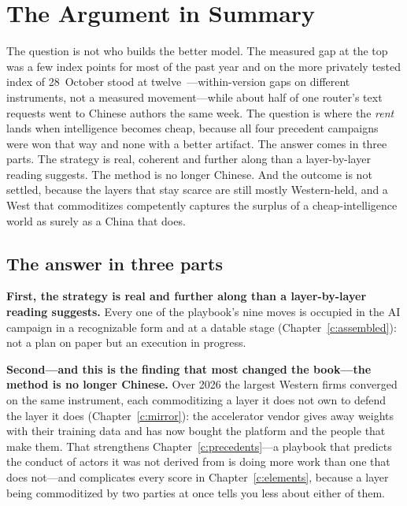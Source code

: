 \chapter{The Argument in Summary}
\label{c:summary}

\begin{glance}
The question is not who builds the better model. The measured gap at the top was a few index points for most of the past year and on the more privately tested index of 28~October stood at twelve~\cite{mdl-aa-v5}---within-version gaps on different instruments, not a measured movement---while about half of one router's text requests went to Chinese authors the same week. The question is where the \emph{rent} lands when intelligence becomes cheap, because all four precedent campaigns were won that way and none with a better artifact. The answer comes in three parts. The strategy is real, coherent and further along than a layer-by-layer reading suggests. The method is no longer Chinese. And the outcome is not settled, because the layers that stay scarce are still mostly Western-held, and a West that commoditizes competently captures the surplus of a cheap-intelligence world as surely as a China that does. 
\end{glance}

\section{The answer in three parts}

\textbf{First, the strategy is real and further along than a layer-by-layer reading suggests.} Every one of the playbook's nine moves is occupied in the AI campaign in a recognizable form and at a datable stage (Chapter~\ref{c:assembled}): not a plan on paper but an execution in progress.

\textbf{Second---and this is the finding that most changed the book---the method is no longer Chinese.} Over 2026 the largest Western firms converged on the same instrument, each commoditizing a layer it does not own to defend the layer it does (Chapter~\ref{c:mirror}): the accelerator vendor gives away weights with their training data and has now bought the platform and the people that make them. That strengthens Chapter~\ref{c:precedents}---a playbook that predicts the conduct of actors it was not derived from is doing more work than one that does not---and complicates every score in Chapter~\ref{c:elements}, because a layer being commoditized by two parties at once tells you less about either of them.


